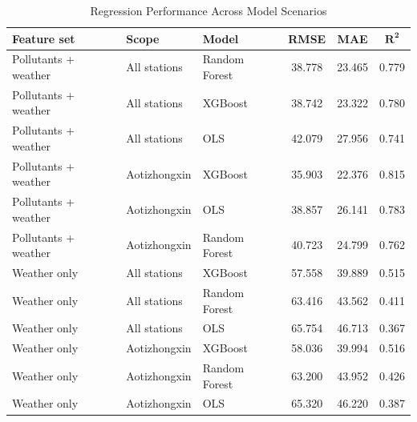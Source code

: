 \documentclass[stu,12pt,floatsintext]{apa7}
\begin{document}
\begin{table}[H]
  \begin{threeparttable}
  \caption{Regression Performance Across Model Scenarios}
  \label{tab:regfull}
  \small
  \begin{tabular}{>{}p{3.0cm}>{}p{2.5cm}>{}p{2.5cm}ccc}
    \toprule
    \textbf{Feature set} & \textbf{Scope} & \textbf{Model}
      & \textbf{RMSE} & \textbf{MAE} & $\boldsymbol{R^{2}}$ \\
    \midrule
    Pollutants + weather & All stations & Random Forest & 38.778 & 23.465 & 0.779 \\
    Pollutants + weather & All stations & XGBoost       & 38.742 & 23.322 & 0.780 \\
    Pollutants + weather & All stations & OLS           & 42.079 & 27.956 & 0.741 \\
    Pollutants + weather & Aotizhongxin & XGBoost       & 35.903 & 22.376 & 0.815 \\
    Pollutants + weather & Aotizhongxin & OLS           & 38.857 & 26.141 & 0.783 \\
    Pollutants + weather & Aotizhongxin & Random Forest & 40.723 & 24.799 & 0.762 \\
    Weather only         & All stations & XGBoost       & 57.558 & 39.889 & 0.515 \\
    Weather only         & All stations & Random Forest & 63.416 & 43.562 & 0.411 \\
    Weather only         & All stations & OLS           & 65.754 & 46.713 & 0.367 \\
    Weather only         & Aotizhongxin & XGBoost       & 58.036 & 39.994 & 0.516 \\
    Weather only         & Aotizhongxin & Random Forest & 63.200 & 43.952 & 0.426 \\
    Weather only         & Aotizhongxin & OLS           & 65.320 & 46.220 & 0.387 \\
    \bottomrule
  \end{tabular}
  \end{threeparttable}
\end{table}
\end{document}
